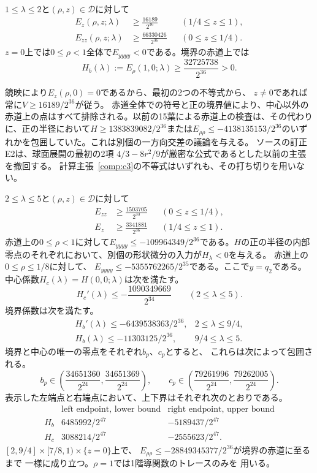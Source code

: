 \begin{computationalassertion}[球に近い帯]
\label{comp:c3}
$1\leq\lambda\leq2$と$(\rho,z)\in\mathcal D$に対して
\begin{align*}
 E_z(\rho,z;\lambda)&\geq\frac{16189}{2^{36}}
       &&(1/4\leq z\leq1),\\
 E_{zz}(\rho,z;\lambda)&\geq\frac{66330426}{2^{36}}
       &&(0\leq z\leq1/4).
\end{align*}
$z=0$上では$0\leq\rho<1$全体で$E_{yyyy}<0$である。境界の赤道上では
\[
 H_b(\lambda):=E_\rho(1,0;\lambda)
 \geq\frac{32725738}{2^{36}}>0.
\]
\end{computationalassertion}

鏡映により$E_z(\rho,0)=0$であるから、最初の2つの不等式から、
$z\ne0$であれば常に$V\geq16189/2^{36}$が従う。
赤道全体での符号と正の境界値により、中心以外の赤道上の点はすべて排除される。以前の15葉による赤道上の検査は、その代わりに、正の半径において$H\geq1383839082/2^{36}$または$E_{\rho\rho}\leq-4138135153/2^{36}$のいずれかを包囲していた。これは別個の一方向交差の議論を与える。
ソースの訂正E2は、球面展開の最初の2項
$4/3-8r^2/9$が厳密な公式であるとした以前の主張を撤回する。
計算主張~\ref{comp:c3}の不等式はいずれも、その打ち切りを用いない\citep{data-near-sphere}。

\begin{computationalassertion}[扁長側の有限な窓]
\label{comp:c4}
$2\leq\lambda\leq5$と$(\rho,z)\in\mathcal D$に対して
\begin{align*}
 E_{zz}&\geq\frac{1503705}{2^{33}}
          &&(0\leq z\leq1/4),\\
 E_z&\geq\frac{3341881}{2^{36}}
          &&(1/4\leq z\leq1).
\end{align*}
赤道上の$0\leq\rho<1$に対して$E_{yyyy}\leq-109964349/2^{36}$である。$H$の正の半径の内部零点のそれぞれにおいて、別個の形状微分の入力が$H_\lambda<0$を与える。
赤道上の$0\leq\rho\leq1/8$に対して、
$E_{yyyy}\leq-5355762265/2^{35}$である。ここで$y=q_2$である。
中心係数$H_c(\lambda)=H(0,0;\lambda)$は次を満たす。
\[
 H_c'(\lambda)\leq-\frac{1090349669}{2^{34}}
 \qquad(2\leq\lambda\leq5).
\]
境界係数は次を満たす。
\[
 \begin{array}{ll}
 H_b'(\lambda)\leq-6439538363/2^{36},&2\leq\lambda\leq9/4,\\
 H_b(\lambda)\leq-11303125/2^{36},&9/4\leq\lambda\leq5.
 \end{array}
\]
境界と中心の唯一の零点をそれぞれ$b_p$、$c_p$とすると、
これらは次によって包囲される。
\[
 b_p\in\left(\frac{34651360}{2^{24}},\frac{34651369}{2^{24}}\right),
 \qquad
 c_p\in\left(\frac{79261996}{2^{24}},\frac{79262005}{2^{24}}\right).
\]
表示した左端点と右端点において、上下界はそれぞれ次のとおりである。
\[
 \begin{array}{c|cc}
 &\text{left endpoint, lower bound}&\text{right endpoint, upper bound}\\ \hline
 H_b&6485992/2^{47}&-5189437/2^{47}\\
 H_c&3088214/2^{47}&-2555623/2^{47}.
 \end{array}
\]
$[2,9/4]\times[7/8,1)\times\{z=0\}$上で、
$E_{\rho\rho}\leq-28849345377/2^{36}$が境界の赤道に至るまで
一様に成り立つ。$\rho=1$では1階導関数のトレースのみを
用いる。
\end{computationalassertion}

